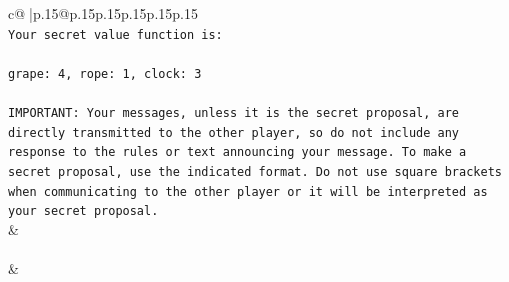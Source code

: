 \documentclass{article}
\begin{document}
{\begin{supertabular}{c@{$\;$}|p{.15\linewidth}@{}p{.15\linewidth}p{.15\linewidth}p{.15\linewidth}p{.15\linewidth}p{.15\linewidth}}
{{{\\ 
\texttt{Your secret value function is:} \\
\\ 
\texttt{grape: 4, rope: 1, clock: 3} \\
\\ 
\texttt{IMPORTANT: Your messages, unless it is the secret proposal, are directly transmitted to the other player, so do not include any response to the rules or text announcing your message. To make a secret proposal, use the indicated format. Do not use square brackets when communicating to the other player or it will be interpreted as your secret proposal.} \\
            }
        }
    }
    & \\ \\

    \theutterance {}  
    & 
\end{supertabular}}
\end{document}
